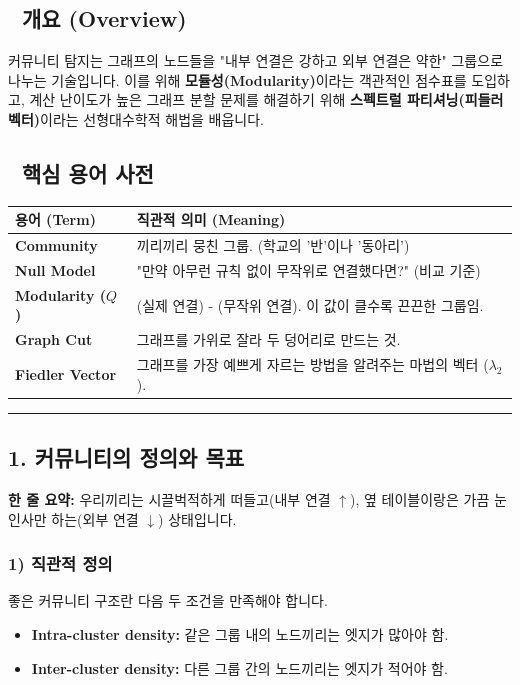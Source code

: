 \documentclass[11pt,a4paper]{book}
\theoremstyle{definition}
\begin{document}
\subsection*{📌 개요 (Overview)}
커뮤니티 탐지는 그래프의 노드들을 "내부 연결은 강하고 외부 연결은 약한" 그룹으로 나누는 기술입니다. 이를 위해 \textbf{모듈성(Modularity)}이라는 객관적인 점수표를 도입하고, 계산 난이도가 높은 그래프 분할 문제를 해결하기 위해 \textbf{스펙트럴 파티셔닝(피들러 벡터)}이라는 선형대수학적 해법을 배웁니다.

\subsection*{📝 핵심 용어 사전}
\begin{table}[h]
\centering
\begin{tabularx}{\textwidth}{|p{}|X|}
\hline
\textbf{용어 (Term)} & \textbf{직관적 의미 (Meaning)} \\
\hline
\textbf{Community} & 끼리끼리 뭉친 그룹. (학교의 '반'이나 '동아리') \\
\hline
\textbf{Null Model} & "만약 아무런 규칙 없이 무작위로 연결했다면?" (비교 기준) \\
\hline
\textbf{Modularity ($Q$)} & (실제 연결) - (무작위 연결). 이 값이 클수록 끈끈한 그룹임. \\
\hline
\textbf{Graph Cut} & 그래프를 가위로 잘라 두 덩어리로 만드는 것. \\
\hline
\textbf{Fiedler Vector} & 그래프를 가장 예쁘게 자르는 방법을 알려주는 마법의 벡터 ($\lambda_2$). \\
\hline
\end{tabularx}
\end{table}

\vspace{0.5cm}\hrule\vspace{0.5cm}

\subsection{1. 커뮤니티의 정의와 목표}

\begin{conceptbox}[title={개념 1: 학교 식당 풍경}]
\textbf{한 줄 요약:} 우리끼리는 시끌벅적하게 떠들고(내부 연결 $\uparrow$), 옆 테이블이랑은 가끔 눈인사만 하는(외부 연결 $\downarrow$) 상태입니다.
\end{conceptbox}

\subsubsection*{1) 직관적 정의}
좋은 커뮤니티 구조란 다음 두 조건을 만족해야 합니다.
\begin{itemize}
    \item \textbf{Intra-cluster density:} 같은 그룹 내의 노드끼리는 엣지가 많아야 함.
    \item \textbf{Inter-cluster density:} 다른 그룹 간의 노드끼리는 엣지가 적어야 함.
\end{itemize}
\end{document}
